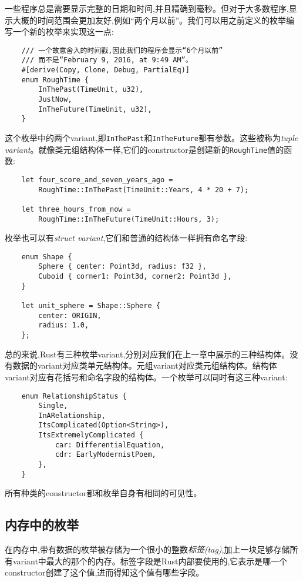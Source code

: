 一些程序总是需要显示完整的日期和时间,并且精确到毫秒。但对于大多数程序,显示大概的时间范围会更加友好,例如“两个月以前”。我们可以用之前定义的枚举编写一个新的枚举来实现这一点:
\begin{verbatim}
    /// 一个故意舍入的时间戳,因此我们的程序会显示“6个月以前”
    /// 而不是“February 9, 2016, at 9:49 AM”。
    #[derive(Copy, Clone, Debug, PartialEq)]
    enum RoughTime {
        InThePast(TimeUnit, u32),
        JustNow,
        InTheFuture(TimeUnit, u32),
    }
\end{verbatim}

这个枚举中的两个variant,即\texttt{InThePast}和\texttt{InTheFuture}都有参数。这些被称为\emph{tuple variant}。就像类元组结构体一样,它们的constructor是创建新的\texttt{RoughTime}值的函数:
\begin{verbatim}
    let four_score_and_seven_years_ago =
        RoughTime::InThePast(TimeUnit::Years, 4 * 20 + 7);

    let three_hours_from_now =
        RoughTime::InTheFuture(TimeUnit::Hours, 3);
\end{verbatim}

枚举也可以有\emph{struct variant},它们和普通的结构体一样拥有命名字段:
\begin{verbatim}
    enum Shape {
        Sphere { center: Point3d, radius: f32 },
        Cuboid { corner1: Point3d, corner2: Point3d },
    }

    let unit_sphere = Shape::Sphere {
        center: ORIGIN,
        radius: 1.0,
    };
\end{verbatim}

总的来说,Rust有三种枚举variant,分别对应我们在上一章中展示的三种结构体。没有数据的variant对应类单元结构体。元组variant对应类元组结构体。结构体variant对应有花括号和命名字段的结构体。一个枚举可以同时有这三种variant:
\begin{verbatim}
    enum RelationshipStatus {
        Single,
        InARelationship,
        ItsComplicated(Option<String>),
        ItsExtremelyComplicated {
            car: DifferentialEquation, 
            cdr: EarlyModernistPoem,
        },
    }
\end{verbatim}

所有种类的constructor都和枚举自身有相同的可见性。

\subsection{内存中的枚举}

在内存中,带有数据的枚举被存储为一个很小的整数\emph{标签(tag)},加上一块足够存储所有variant中最大的那个的内存。标签字段是Rust内部要使用的,它表示是哪一个constructor创建了这个值,进而得知这个值有哪些字段。

